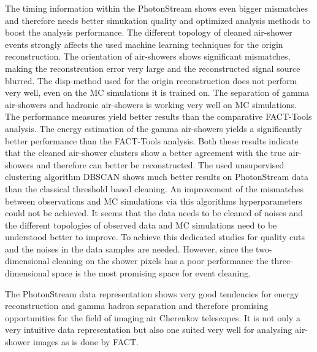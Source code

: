 The timing information within the PhotonStream shows even bigger mismatches and
therefore needs better simukation quality and optimized analysis methods to
boost the analysis performance. The different topology of cleaned air-shower
events strongly affects the used machine learning techniques for the origin
reconstruction. The orientation of air-showers shows significant mismatches,
making the reconstrcution error very large and the reconstructed signal source
blurred. The disp-method used for the origin reconstruction does not perform
very well, even on the MC simulations it is trained on. The separation of gamma
air-showers and hadronic air-showers is working very well on MC simulations.
The performance measures yield better results than the comparative FACT-Tools
analysis. The energy estimation of the gamma air-showers yields a significantly
better performance than the FACT-Tools analysis. Both these results indicate
that the cleaned air-shower clusters show a better agreement with the true air-
showers and therefore can better be reconstructed. The used unsupervised
clustering algorithm DBSCAN shows much better results on PhotonStream data than
the classical threshold based cleaning. An improvement of the mismatches
between observations and MC simulations via this algorithms hyperparameters
could not be achieved. It seems that the data needs to be cleaned of noises and
the different topologies of observed data and MC simulations need to be
understood better to improve. To achieve this dedicated studies for quality
cuts and the noises in the data samples are needed. However, since the two-
dimensional cleaning on the shower pixels has a poor performance the three-
dimensional space is the most promising space for event cleaning.

The PhotonStream data representation shows very good tendencies for energy
reconstruction and gamma hadron separation and therefore promising
opportunities for the field of imaging air Cherenkov telescopes. It is not only
a very intuitive data representation but also one suited very well for
analysing air-shower images as is done by FACT.
